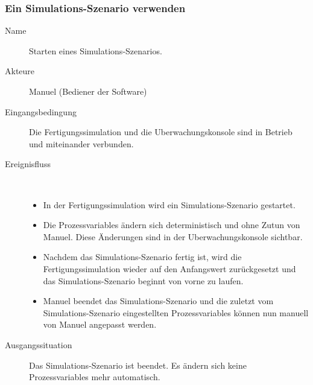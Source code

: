 \documentclass[parskip=full]{scrartcl}
\begin{document}
\subsubsection{Ein Simulations-Szenario verwenden}
\begin{description}
  \item[Name] Starten eines \gls{Simulations-Szenario}s.
  \item[Akteure] Manuel (Bediener der Software)
  \item[Eingangsbedingung] Die \gls{Fertigungssimulation} und die \gls{Uberwachungskonsole} sind in Betrieb und miteinander verbunden.
  \item[Ereignisfluss]~\\
  \begin{itemize}[noitemsep]
    \item In der \gls{Fertigungssimulation} wird ein \gls{Simulations-Szenario} gestartet.
    \item Die \glspl{Prozessvariable} ändern sich deterministisch und ohne Zutun von Manuel. Diese Änderungen sind in der \gls{Uberwachungskonsole} sichtbar.
    \item Nachdem das \gls{Simulations-Szenario} fertig ist, wird die \gls{Fertigungssimulation} wieder auf den Anfangswert zurückgesetzt und das
    \gls{Simulations-Szenario} beginnt von vorne zu laufen.
    \item Manuel beendet das \gls{Simulations-Szenario} und die zuletzt vom \gls{Simulations-Szenario} eingestellten \glspl{Prozessvariable} können nun manuell von Manuel angepasst werden.
  \end{itemize}
  \item[Ausgangssituation] Das \gls{Simulations-Szenario} ist beendet. Es ändern sich keine \glspl{Prozessvariable} mehr automatisch.
\end{description}
\end{document}
